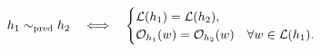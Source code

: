 \setcounter{equation}{19}
\begin{equation}
h_1\sim_{\rm pred}h_2
\quad\Longleftrightarrow\quad
\begin{cases}
\mathcal L(h_1)=\mathcal L(h_2),\\
\mathcal O_{h_1}(w)=\mathcal O_{h_2}(w)\quad\forall w\in\mathcal L(h_1).
\end{cases}
\label{eq:predictive}
\end{equation}
